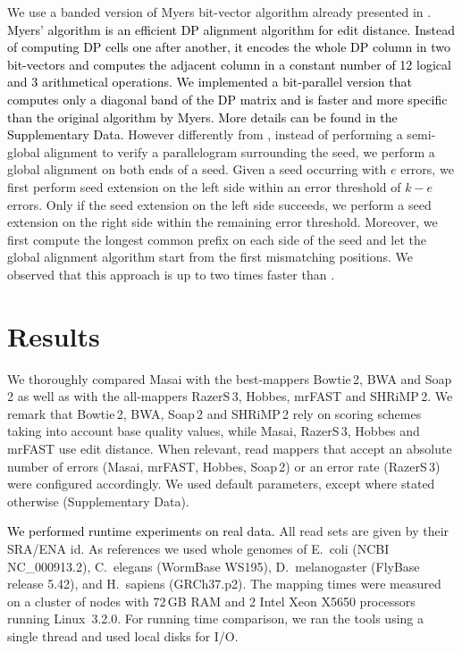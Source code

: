 \documentclass[a4,center,fleqn]{article}
\begin{document}
We use a banded version of Myers bit-vector algorithm \cite{Myers1999} already presented in \cite{Razers3}.
\textcolor{black}{
Myers' algorithm is an efficient DP alignment algorithm \cite{Needleman1970} for edit distance. 
Instead of computing DP cells one after another, it encodes the whole DP column in two bit-vectors and computes the adjacent column in a constant number of 12 logical and 3 arithmetical operations.
We implemented a bit-parallel version that computes only a diagonal band of the DP matrix and is faster and more specific than the original algorithm by Myers.
More details can be found in the Supplementary Data.
}
However differently from \cite{Razers3}, instead of performing a semi-global alignment to verify a parallelogram surrounding the seed, we perform a global alignment on both ends of a seed.
Given a seed occurring with $e$ errors, we first perform seed extension on the left side within an error threshold of $k - e$ errors.
Only if the seed extension on the left side succeeds, we perform a seed extension on the right side within the remaining error threshold.
Moreover, we first compute the longest common prefix on each side of the seed and let the global alignment algorithm start from the first mismatching positions.
We observed that this approach is up to two times faster than \cite{Razers3}.



\section{Results}

We thoroughly compared Masai with the best-mappers Bowtie\,2, BWA and Soap\,2 as well as with the all-mappers RazerS\,3, Hobbes, mrFAST and SHRiMP\,2.
We remark that Bowtie\,2, BWA, Soap\,2 and SHRiMP\,2 rely on scoring schemes taking into account base quality values, while Masai, RazerS\,3, Hobbes and mrFAST use edit distance.
When relevant, read mappers that accept an absolute number of errors (Masai, mrFAST, Hobbes, Soap\,2) or an error rate (RazerS\,3) were configured accordingly.
We used default parameters, except where stated otherwise (Supplementary Data).

\textcolor{black}{We performed runtime experiments on real data.}
All read sets are given by their SRA/ENA id.
As references we used whole genomes of E.~coli (NCBI NC\_000913.2), C.~elegans (WormBase WS195), D.~melanogaster (FlyBase release 5.42), and H.~sapiens (GRCh37.p2).
The mapping times were measured on a cluster of nodes with 72\,GB RAM and 2 Intel Xeon X5650 processors running Linux~3.2.0.
For running time comparison, we ran the tools using a single thread and used local disks for I/O.
\end{document}
